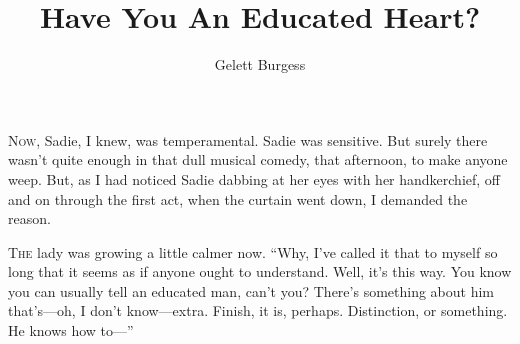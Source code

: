 \documentclass[twosided]{book}
\title{Have You An Educated Heart?}
\author{Gelett Burgess}
\begin{document}
\pagestyle{fancy}
\fancyhf{}
\fancyfoot[RE,RO]{\hfill\thepage\hfill}

\maketitle
\lettrine{N}{ow}, Sadie, I knew, was temperamental. Sadie was sensitive. But surely
there wasn’t quite enough in that dull musical comedy, that afternoon,
to make anyone weep. But, as I had noticed Sadie dabbing at her eyes
with her handkerchief, off and on through the first act, when the
curtain went down, I demanded the reason.


\newpage
\lettrine{T}{he} lady was growing a little calmer now. “Why, I’ve called it that to
myself so long that it seems as if anyone ought to understand. Well,
it’s this way. You know you can usually tell an educated man, can’t you?
There’s something about him that’s---oh, I don’t know---extra. Finish, it
is, perhaps. Distinction, or something. He knows how to---”

\newpage
\end{document}
